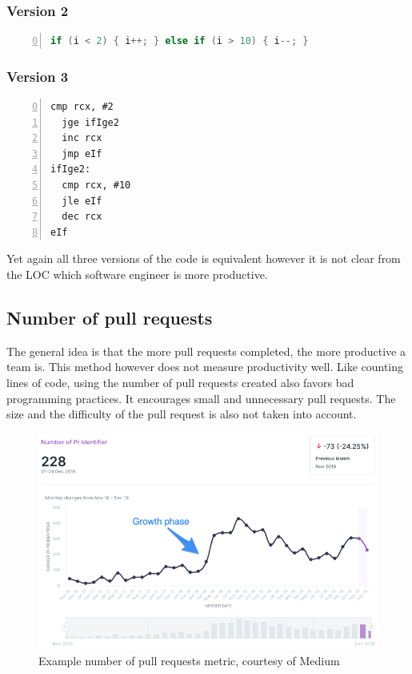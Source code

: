 \documentclass{article}
\begin{document}
\subsubsection{Version 2}
\begin{lstlisting}[language=Java,frame=single,firstnumber=0,numbers=left,label={lst:fmtv2}]
if (i < 2) { i++; } else if (i > 10) { i--; }
\end{lstlisting}

\subsubsection{Version 3}
\begin{lstlisting}[language={[x86masm]Assembler},frame=single,firstnumber=0,numbers=left,label={lst:fmtv3}]
  cmp rcx, #2
  jge ifIge2
  inc rcx
  jmp eIf
ifIge2:
  cmp rcx, #10
  jle eIf
  dec rcx
eIf
\end{lstlisting}

Yet again all three versions of the code is equivalent however it is not clear
from the LOC which software engineer is more productive.

\subsection{Number of pull requests}
The general idea is that the more pull requests completed, the more productive
a team is. This method however does not measure productivity well. Like
counting lines of code, using the number of pull requests created also favors
bad programming practices. It encourages small and unnecessary pull requests.
The size and the difficulty of the pull request is also not taken into account.

\begin{figure}[h]
  \includegraphics[width=\linewidth]{images/number_of_pr.png}
  \caption{Example number of pull requests metric, courtesy of
  Medium~\cite{metrics2020wrong}}
\end{figure}
\end{document}
